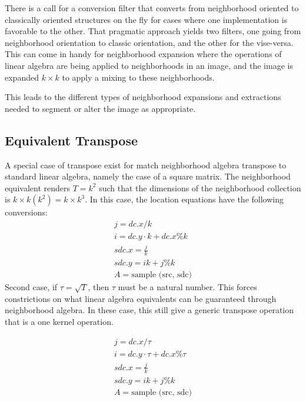 \documentclass[11pt]{article}
\begin{document}
There is a call for a conversion filter that converts from neighborhood oriented to classically oriented structures on the fly for cases where one implementation is favorable to the other.   That pragmatic approach yields two filters, one going from neighborhood orientation to classic orientation, and the other for the vise-versa.  This can come in handy for neighborhood expansion where the operations of linear algebra are being applied to neighborhoods in an image, and the image is expanded $k \times k$ to apply a mixing to these neighborhoods.     

This leads to the different types of neighborhood expansions and extractions needed to segment or alter the image as appropriate.  



\subsection{Equivalent Transpose}

A special case of transpose exist for match neighborhood algebra transpose to standard linear algebra, namely the case of a square matrix.   The neighborhood equivalent renders $T = k^2$ such that the dimensions of the neighborhood collection is $k \times k(k^2) = k \times k^3$.  In this case, the location equations have the following conversions:
\begin{eqnarray}
	j = dc.x / k \\
	i = dc.y \cdot k  + dc.x \% k \\
	sdc.x = \frac{j}{k} \\
	sdc.y = ik + j \% k \\
	A = \textrm{sample (src, sdc)}
\end{eqnarray}
Second case, if $\tau = \sqrt {T}$, then $\tau$ must be a natural number.  This forces constrictions on what linear algebra equivalents can be guaranteed through neighborhood algebra.   In these case, this still give a generic transpose operation that is a one kernel operation. 


\begin{eqnarray}
	j = dc.x / \tau \\
	i = dc.y \cdot \tau  + dc.x \% \tau \\
	sdc.x = \frac{j}{k} \\
	sdc.y = ik + j \% k \\
	A = \textrm{sample (src, sdc)}
\end{eqnarray}
\end{document}
